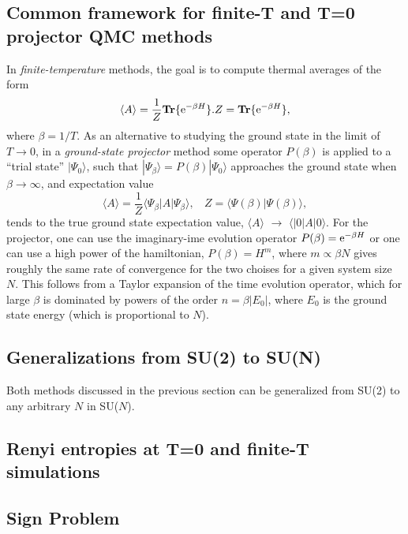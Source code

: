 \documentclass[aps,prb,groupedaddress,twocolumn]{revtex4}
\begin{document}
\subsection{Common framework for finite-T and T=0 projector QMC methods}
\label{ss:method}

In {\it finite-temperature} methods, the goal is to compute thermal averages of the form
\begin{equation}
\langle A\rangle = \frac{1}{Z}{\bf Tr}\{ {\rm e}^{-\beta H}\}.
Z = {\bf Tr}\{ {\rm e}^{-\beta H}\},
\end{equation}
where $\beta=1/T$. As an alternative to studying the ground state in the limit of  $T\to 0$, in a {\it ground-state projector} method some 
operator $P(\beta)$  is applied to a ``trial state'' $|\Psi_0\rangle$, such that $|\Psi_\beta \rangle = P(\beta)|\Psi_0\rangle$ approaches the 
ground state when $\beta \to \infty$, and expectation value 
\begin{equation}
\langle A\rangle = \frac{1}{Z}\langle \Psi_\beta|A|\Psi_\beta\rangle,~~~~ Z = \langle \Psi(\beta)|\Psi(\beta)\rangle,
\end{equation}
tends to the true ground state expectation value, $\langle A\rangle$ $\to$ $\langle|0| A|0\rangle$. For the projector, one can use the imaginary-ime
evolution operator $P(\beta)={\rm e}^{-\beta H}$ or one can use a high power of the hamiltonian, $P(\beta)=H^m$, where $m \propto \beta N$ gives roughly 
the same rate of convergence for the two choises for a given system size $N$. This follows from a Taylor expansion of the time evolution operator, 
which for large $\beta$ is dominated by powers of the order $n=\beta |E_0|$, where $E_0$ is the ground state energy (which is proportional to $N$).



\subsection {Generalizations from SU(2) to SU(N)}
\label{ss:su2N}

Both methods discussed in the previous section can be generalized from
SU(2) to any arbitrary $N$ in SU($N$). 

\subsection{Renyi entropies at T=0 and finite-T simulations}

\subsection{Sign Problem}
\label{ss:sign}
\end{document}
